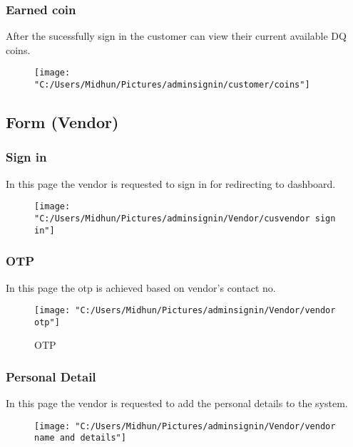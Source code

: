 \documentclass{beamer}
\begin{document}
\begin{frame}
\subsubsection{Earned coin}
After the sucessfully sign in the customer can view their current available DQ coins.
\begin{figure}[bph]
	\centering
	\texttt{[image: "C:/Users/Midhun/Pictures/adminsignin/customer/coins"]}
	\label{fig:admin-signin}
\end{figure}

\end{frame}

\begin{frame}
\section{Form (Vendor)}
\subsubsection{Sign in}
In this page the vendor is requested to sign in for redirecting to dashboard. 
\begin{figure}[bph]
	\centering
	\texttt{[image: "C:/Users/Midhun/Pictures/adminsignin/Vendor/cusvendor sign in"]}
	\label{fig:admin-signin}
\end{figure}


\end{frame}

\begin{frame}
\subsubsection{OTP}
In this page the otp is achieved based on vendor's contact no. 
\begin{figure}[bph]
	\centering
	\texttt{[image: "C:/Users/Midhun/Pictures/adminsignin/Vendor/vendor otp"]}
	\caption{OTP}
	\label{fig:admin-signin}
\end{figure}

\end{frame}
\subsubsection{Personal Detail}
In this page the vendor is requested to add the personal details to the system.
\begin{figure}[bph]
	\centering
	\texttt{[image: "C:/Users/Midhun/Pictures/adminsignin/Vendor/vendor name and details"]}
	\label{fig:admin-signin}
\end{figure}
\end{document}
